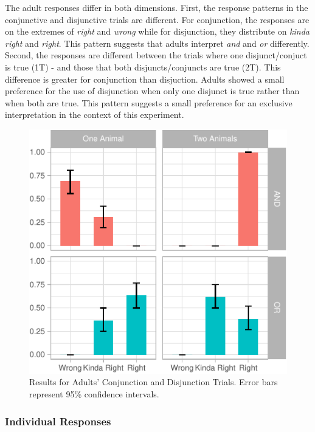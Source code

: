 \documentclass[10pt, letterpaper]{article}
\newenvironment{CodeChunk}{}{}
\begin{document}
The adult responses differ in both dimensions. First, the response
patterns in the conjunctive and disjunctive trials are different. For
conjunction, the responses are on the extremes of \emph{right} and
\emph{wrong} while for disjunction, they distribute on \emph{kinda
right} and \emph{right}. This pattern suggests that adults interpret
\emph{and} and \emph{or} differently. Second, the responses are
different between the trials where one disjunct/conjuct is true (1T) -
and those that both disjuncts/conjuncts are true (2T). This difference
is greater for conjunction than disjuction. Adults showed a small
preference for the use of disjunction when only one disjunct is true
rather than when both are true. This pattern suggests a small preference
for an exclusive interpretation in the context of this experiment.

\begin{CodeChunk}
\begin{figure}[h]

{\centering \includegraphics{figs/plot-1} 

}

\caption[Results for Adults' Conjunction and Disjunction Trials]{Results for Adults' Conjunction and Disjunction Trials. Error bars represent 95\% confidence intervals.}\label{fig:plot}
\end{figure}
\end{CodeChunk}

\subsubsection{Individual Responses}\label{individual-responses}
\end{document}

